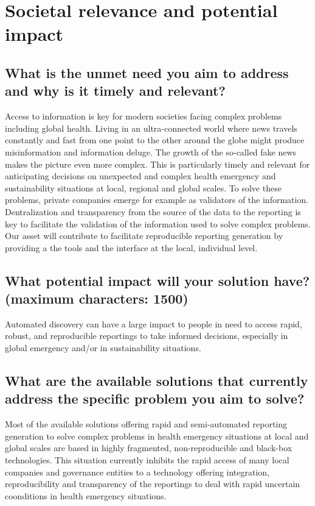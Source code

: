 \documentclass[authoryear,1p,12pt]{elsarticle}
\begin{document}
\section{{\bf Societal relevance and potential impact}}


\subsection{{\bf What is the unmet need you aim to address} and why is it
    timely and relevant?}

  Access to information is key for modern societies facing complex
  problems including global health. Living in an ultra-connected world
  where news travels constantly and fast from one point to the other
  around the globe might produce misinformation and information
  deluge. The growth of the so-called fake news makes the picture even
  more complex. This is particularly timely and relevant for
  anticipating decisions on unexpected and complex health emergency
  and sustainability situations at local, regional and global
  scales. To solve these problems, private companies emerge for
  example as validators of the information. Dentralization and
  transparency from the source of the data to the reporting is key to
  facilitate the validation of the information used to solve complex
  problems. Our asset will contribute to facilitate reproducible
  reporting generation by providing a the tools and the interface at
  the local, individual level.

\subsection{{\bf What potential impact will your solution have?} (maximum
  characters: 1500)}
Automated discovery can have a large impact to people in need to
access rapid, robust, and reproducible reportings to take informed
decisions, especially in global emergency and/or in sustainability
situations.

\subsection{{\bf What are the available solutions that currently address
  the specific problem you aim to solve?}}

Most of the available solutions offering rapid and semi-automated
reporting generation to solve complex problems in health emergency
situations at local and global scales are based in highly fragmented,
non-reproducible and black-box technologies. This situation currently
inhibits the rapid access of many local companies and governance
entities to a technology offering integration, reproducibility and
transparency of the reportings to deal with rapid uncertain coonditions
in health emergency situations.
\end{document}
